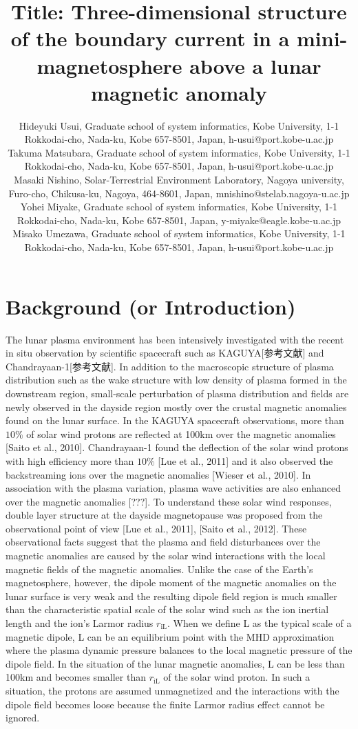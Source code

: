 \documentclass{EPS}
\title{Title: 
	Three-dimensional structure of the boundary current in a mini-magnetosphere above a lunar magnetic anomaly 
}
\author{
	Hideyuki Usui, 
	Graduate school of system informatics, Kobe University, 
	1-1 Rokkodai-cho, Nada-ku, Kobe 657-8501, Japan, h-usui@port.kobe-u.ac.jp \\
	Takuma Matsubara, 
	Graduate school of system informatics, Kobe University, 
	1-1 Rokkodai-cho, Nada-ku, Kobe 657-8501, Japan, h-usui@port.kobe-u.ac.jp \\
	Masaki Nishino, 
	Solar-Terrestrial Environment Laboratory, Nagoya university, 
	Furo-cho, Chikusa-ku, Nagoya, 464-8601, Japan, mnishino@stelab.nagoya-u.ac.jp  \\
	Yohei Miyake, 
	Graduate school of system informatics, Kobe University, 
	1-1 Rokkodai-cho, Nada-ku, Kobe 657-8501, Japan, y-miyake@eagle.kobe-u.ac.jp \\
	Misako Umezawa, 
	Graduate school of system informatics, Kobe University, 
	1-1 Rokkodai-cho, Nada-ku, Kobe 657-8501, Japan, h-usui@port.kobe-u.ac.jp
}
\begin{document}
\maketitle

\section{Background (or Introduction)}
The lunar plasma environment has been intensively investigated with the recent in situ observation 
by scientific spacecraft such as KAGUYA[参考文献] and Chandrayaan-1[参考文献]. 
In addition to the macroscopic structure of plasma distribution such as the wake structure 
with low density of plasma formed in the downstream region, small-scale perturbation of 
plasma distribution and fields are newly observed in the dayside region mostly 
over the crustal magnetic anomalies found on the lunar surface. 
In the KAGUYA spacecraft observations, more than $10 \%$ of solar wind protons are reflected 
at 100km over the magnetic anomalies [Saito et al., 2010]. 
Chandrayaan-1 found the deflection of the solar wind protons with high efficiency more than $ 10 \%$ [Lue et al., 2011]  
and it also observed the backstreaming ions over the magnetic anomalies [Wieser et al., 2010]. 
In association with the plasma variation, plasma wave activities are also enhanced over 
the magnetic anomalies [???].
To understand these solar wind responses, double layer structure at the dayside magnetopause was 
proposed from the observational point of view [Lue et al., 2011], [Saito et al., 2012]. 
These observational facts suggest that the plasma and field disturbances over 
the magnetic anomalies are caused by the solar wind interactions with the local magnetic fields of the magnetic anomalies. 
Unlike the case of the Earth’s magnetosphere, however, the dipole moment of 
the magnetic anomalies on the lunar surface is very weak and the resulting dipole field region 
is much smaller than the characteristic spatial scale of the solar wind such as 
the ion inertial length and the ion's Larmor radius 
$r_\mathrm{iL}$. 
When we define L as the typical scale of a magnetic dipole, 
L can be an equilibrium point with the MHD approximation where the plasma dynamic pressure balances 
to the local magnetic pressure of the dipole field. 
In the situation of the lunar magnetic anomalies, L can be less than 100km and 
becomes smaller than $r_\mathrm{iL}$ of the solar wind proton. 
In such a situation, the protons are assumed unmagnetized and the interactions with the dipole field becomes 
loose because the finite Larmor radius effect cannot be ignored. 
\end{document}
